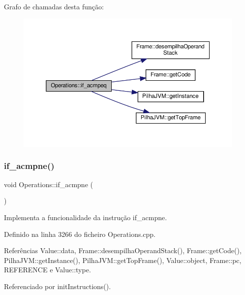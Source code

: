 Grafo de chamadas desta função\+:\nopagebreak
\begin{figure}[H]
\begin{center}
\leavevmode
\includegraphics[width=350pt]{classOperations_aa0432645b0d0effb4d4d839ea2dcec1c_cgraph}
\end{center}
\end{figure}
\mbox{\label{classOperations_a7f43bbfba9b2feb66b695d24c43dc430}} 
\subsubsection{\texorpdfstring{if\+\_\+acmpne()}{if\_acmpne()}}
{\footnotesize\ttfamily void Operations\+::if\+\_\+acmpne (\begin{DoxyParamCaption}{ }\end{DoxyParamCaption})\hspace{0.3cm}{\ttfamily [private]}}



Implementa a funcionalidade da instrução if\+\_\+acmpne. 



Definido na linha 3266 do ficheiro Operations.\+cpp.



Referências Value\+::data, Frame\+::desempilha\+Operand\+Stack(), Frame\+::get\+Code(), Pilha\+J\+V\+M\+::get\+Instance(), Pilha\+J\+V\+M\+::get\+Top\+Frame(), Value\+::object, Frame\+::pc, R\+E\+F\+E\+R\+E\+N\+CE e Value\+::type.



Referenciado por init\+Instructions().

